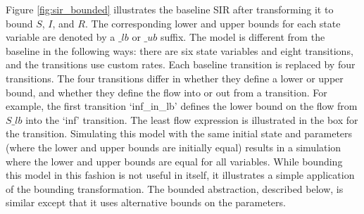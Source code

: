 Figure \ref{fig:sir_bounded} illustrates the baseline SIR after transforming it to bound $S$, $I$, and $R$.  The corresponding lower and upper bounds for each state variable are denoted by a $\_lb$ or $\_ub$ suffix.  The model is different from the baseline in the following ways: there are six state variables and eight transitions, and the transitions use custom rates.  Each baseline transition is replaced by four transitions.  The four transitions differ in whether they define a lower or upper bound, and whether they define the flow into or out from a transition.  For example, the first transition `inf\_in\_lb' defines the lower bound on the flow from $S\_lb$ into the `inf' transition.  The least flow expression is illustrated in the box for the transition.  Simulating this model with the same initial state and parameters (where the lower and upper bounds are initially equal) results in a simulation where the lower and upper bounds are equal for all variables.  While bounding this model in this fashion is not useful in itself, it illustrates a simple application of the bounding transformation.  The bounded abstraction, described below, is similar except that it uses alternative bounds on the parameters.  

